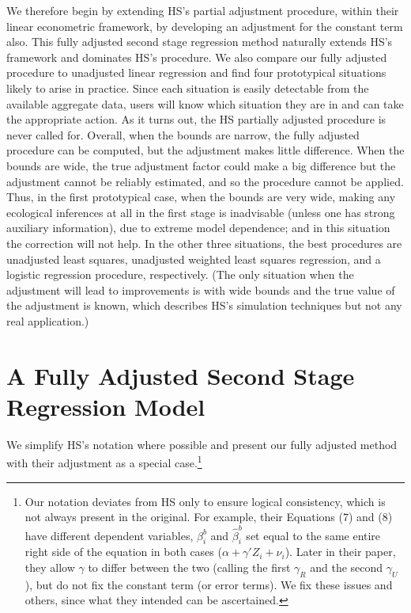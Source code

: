 \documentclass[11pt,titlepage]{article}
\begin{document}
We therefore begin by extending HS's partial adjustment procedure,
within their linear econometric framework, by developing an adjustment
for the constant term also.  This fully adjusted second stage
regression method naturally extends HS's framework and dominates HS's
procedure.  We also compare our fully adjusted procedure to unadjusted
linear regression and find four prototypical situations likely to
arise in practice.  Since each situation is easily detectable from the
available aggregate data, users will know which situation they are in
and can take the appropriate action.  As it turns out, the HS
partially adjusted procedure is never called for.  Overall, when the
bounds are narrow, the fully adjusted procedure can be computed, but
the adjustment makes little difference.  When the bounds are wide, the
true adjustment factor could make a big difference but the adjustment
cannot be reliably estimated, and so the procedure cannot be applied.
Thus, in the first prototypical case, when the bounds are very wide,
making any ecological inferences at all in the first stage is
inadvisable (unless one has strong auxiliary information), due to
extreme model dependence; and in this situation the correction will
not help.  In the other three situations, the best procedures are
unadjusted least squares, unadjusted weighted least squares
regression, and a logistic regression procedure, respectively.  (The
only situation when the adjustment will lead to improvements is with
wide bounds and the true value of the adjustment is known, which
describes HS's simulation techniques but not any real application.)

\section{A Fully Adjusted Second Stage Regression Model}
\label{s:fulladj}

We simplify HS's notation where possible and present our fully
adjusted method with their adjustment as a special case.\footnote{Our
  notation deviates from HS only to ensure logical consistency, which
  is not always present in the original.  For example, their Equations
  (7) and (8) have different dependent variables, $\beta_i^b$ and
  $\hat\beta_i^b$ set equal to the same entire right side of the
  equation in both cases ($\alpha+\gamma'Z_i+\nu_i$).  Later in their
  paper, they allow $\gamma$ to differ between the two (calling the
  first $\gamma_R$ and the second $\gamma_U$), but do not fix the
  constant term (or error terms).  We fix these issues and others,
  since what they intended can be ascertained.}
\end{document}
